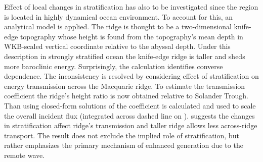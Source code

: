 \documentclass[12pt]{article}
\begin{document}
Effect of local changes in stratification has also to be investigated since the region is located 
in highly dynamical ocean environment.  To account for this, an analytical model 
\citep{st2003generation} is applied. The ridge is thought to be a two-dimensional knife-edge 
topography whose height is found from the topography's mean depth in WKB-scaled vertical coordinate 
\citep{althaus2003internal} relative to the abyssal depth. Under this description in strongly 
stratified ocean the knife-edge ridge is taller and sheds more baroclinic energy. Surprisingly, the 
calculation  identifies converse dependence. The inconsistency is 
resolved by considering effect of stratification on energy transmission across the Macquarie ridge. 
To estimate the transmission coefficient the ridge's height ratio is now obtained relative to 
Solander Trough. Than using closed-form solutions of \citep{larsen1969internal} the coefficient is 
calculated and used to scale the overall incident flux (integrated across dashed line on 
).  suggests the changes in stratification 
affect ridge's transmission and taller ridge allows less across-ridge transport. The result does 
not exclude the implied role of stratification, but rather emphasizes the primary mechanism of 
enhanced generation due to the remote wave.\\
\end{document}
